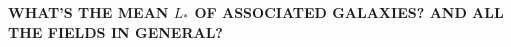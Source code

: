 \documentclass[iop]{emulateapj-rtx4}
\begin{document}
%
%
%
%
%
%
%
%
%
%
%
%
%
%


\textbf{WHAT'S THE MEAN $L_*$ OF ASSOCIATED GALAXIES? AND ALL THE FIELDS IN GENERAL?}


\nocite{*}


\end{document}
